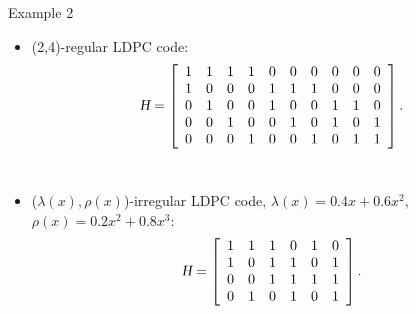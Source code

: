 \documentclass{beamer}
\newcommand{\xieti}{\textsl}
\begin{document}
\begin{frame}
    \begin{block}{Example 2}
    \begin{itemize}
        \item (2,4)-regular LDPC code:
        \[
            \xieti{H}=
            \left[
            \begin{array}[]{cccccccccc}
            1 & 1 & 1 & 1 & 0 & 0 & 0 & 0 & 0 & 0\\
            1 & 0 & 0 & 0 & 1 & 1 & 1 & 0 & 0 & 0\\
            0 & 1 & 0 & 0 & 1 & 0 & 0 & 1 & 1 & 0\\
            0 & 0 & 1 & 0 & 0 & 1 & 0 & 1 & 0 & 1\\
            0 & 0 & 0 & 1 & 0 & 0 & 1 & 0 & 1 & 1\\
            \end{array}
            \right].
        \]\\
        \item ($\lambda(x), \rho(x)$)-irregular LDPC code, $\lambda(x)=0.4x+0.6x^2$, $\rho(x)=0.2x^2+0.8x^3:$
        \[
            \xieti{H}=
            \left[
            \begin{array}[]{cccccc}
            1 & 1 & 1 & 0 & 1 & 0 \\
            1 & 0 & 1 & 1 & 0 & 1 \\
            0 & 0 & 1 & 1 & 1 & 1 \\
            0 & 1 & 0 & 1 & 0 & 1
            \end{array}
            \right].
        \]\\
    \end{itemize}
    \end{block}
\end{frame}
\end{document}
